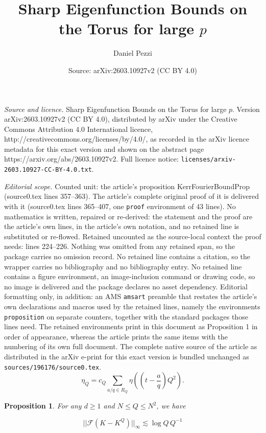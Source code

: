 \documentclass[10pt,a4paper]{amsart}
\title{Sharp Eigenfunction Bounds on the Torus for large $p$}
\author{Daniel Pezzi}
\date{Source: arXiv:2603.10927v2 (CC BY 4.0)}
\newtheorem{proposition}{Proposition}
\newcommand{\lpn}[2]{||{#1}||_{#2}}
\begin{document}
\maketitle

\noindent\emph{Source and licence.} Sharp Eigenfunction Bounds on the Torus for large $p$. Version arXiv:2603.10927v2 (CC BY 4.0), distributed by arXiv under the Creative Commons Attribution 4.0 International licence, http://creativecommons.org/licenses/by/4.0/, as recorded in the arXiv licence metadata for this exact version and shown on the abstract page https://arxiv.org/abs/2603.10927v2. Full licence notice: \texttt{licenses/arxiv-2603.10927-CC-BY-4.0.txt}.\par\smallskip

\noindent\textit{Editorial scope.} Counted unit: the article's proposition KerrFourierBoundProp (source0.tex lines 357--363). The article's complete original proof of it is delivered with it (source0.tex lines 365--407, one \texttt{proof} environment of 43 lines). No mathematics is written, repaired or re-derived: the statement and the proof are the article's own lines, in the article's own notation, and no retained line is substituted or re-flowed.  Retained uncounted as the source-local context the proof needs: lines 224--226.  Nothing was omitted from any retained span, so the package carries no omission record.  No retained line contains a citation, so the wrapper carries no bibliography and no bibliography entry.  No retained line contains a figure environment, an image-inclusion command or drawing code, so no image is delivered and the package declares no asset dependency.  Editorial formatting only, in addition: an AMS \texttt{amsart} preamble that restates the article's own declarations and macros used by the retained lines, namely the environments \texttt{proposition} on separate counters, together with the standard packages those lines need.  The retained environments print in this document as Proposition 1 in order of appearance, whereas the article prints the same items with the numbering of its own full document.  The complete native source of the article as distributed in the arXiv e-print for this exact version is bundled unchanged as \texttt{sources/196176/source0.tex}.
\begin{equation}\label{2: etaQDef}
    \eta_Q = c_Q \sum_{a/q\in R_{Q}}\eta((t-\frac{a}{q})Q^2).
\end{equation}

\begin{proposition}\label{2: KerrFourierBoundProp}
    For any $d\geq 1$ and $N\leq Q\leq N^2$, we have

    \begin{equation}\label{2: KerrFourierBoundEqn}
        \lpn{\mathcal{F}(K-K^Q)}{\infty}\lesssim \log Q\,Q^{-1}
    \end{equation}
\end{proposition}
\end{document}
